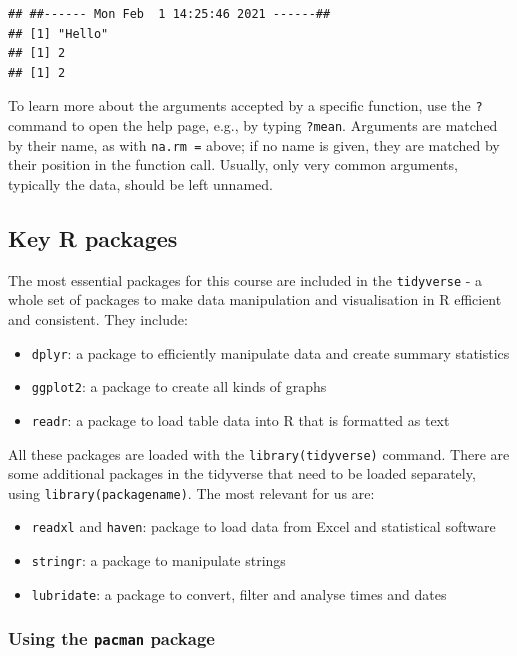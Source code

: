 \documentclass[
]{book}
\providecommand{\tightlist}{%
  \setlength{\itemsep}{0pt}\setlength{\parskip}{0pt}}
\begin{document}
\begin{verbatim}
## ##------ Mon Feb  1 14:25:46 2021 ------##
## [1] "Hello"
## [1] 2
## [1] 2
\end{verbatim}

To learn more about the arguments accepted by a specific function, use the \texttt{?} command to open the help page, e.g., by typing \texttt{?mean}. Arguments are matched by their name, as with \texttt{na.rm\ =} above; if no name is given, they are matched by their position in the function call. Usually, only very common arguments, typically the data, should be left unnamed.

\hypertarget{key-r-packages}{%
\subsection{Key R packages}\label{key-r-packages}}

The most essential packages for this course are included in the \texttt{tidyverse} - a whole set of packages to make data manipulation and visualisation in R efficient and consistent. They include:

\begin{itemize}
\tightlist
\item
  \texttt{dplyr}: a package to efficiently manipulate data and create summary statistics
\item
  \texttt{ggplot2}: a package to create all kinds of graphs
\item
  \texttt{readr}: a package to load table data into R that is formatted as text
\end{itemize}

All these packages are loaded with the \texttt{library(tidyverse)} command. There are some additional packages in the tidyverse that need to be loaded separately, using \texttt{library(packagename)}. The most relevant for us are:

\begin{itemize}
\tightlist
\item
  \texttt{readxl} and \texttt{haven}: package to load data from Excel and statistical software
\item
  \texttt{stringr}: a package to manipulate strings
\item
  \texttt{lubridate}: a package to convert, filter and analyse times and dates
\end{itemize}

\hypertarget{using-the-pacman-package}{%
\subsubsection{\texorpdfstring{Using the \texttt{pacman} package}{Using the pacman package}}\label{using-the-pacman-package}}
\end{document}
